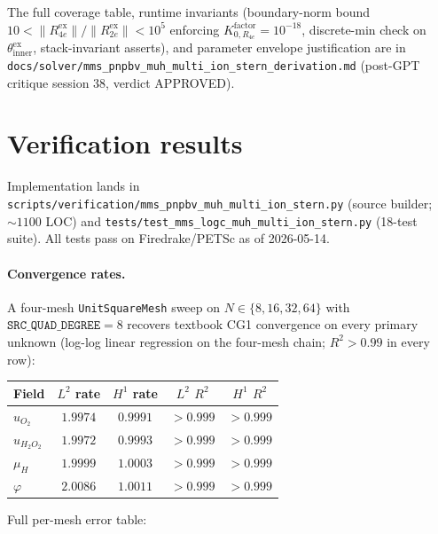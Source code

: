 \documentclass[11pt]{article}
\begin{document}
The full coverage table, runtime invariants (boundary-norm bound
$10 < \lVert R_{4e}^\mathrm{ex} \rVert / \lVert R_{2e}^\mathrm{ex} \rVert
< 10^5$ enforcing $K_{0,R_{4e}}^\mathrm{factor} = 10^{-18}$,
discrete-min check on $\theta_\mathrm{inner}^\mathrm{ex}$, stack-invariant
asserts), and parameter envelope justification are in
\verb|docs/solver/mms_pnpbv_muh_multi_ion_stern_derivation.md| (post-GPT
critique session 38, verdict APPROVED).

\section{Verification results}

Implementation lands in
\verb|scripts/verification/mms_pnpbv_muh_multi_ion_stern.py| (source
builder; $\sim 1100$ LOC) and
\verb|tests/test_mms_logc_muh_multi_ion_stern.py| (18-test suite). All
tests pass on Firedrake/PETSc as of 2026-05-14.

\paragraph{Convergence rates.} A four-mesh
\verb|UnitSquareMesh| sweep on $N \in \{8, 16, 32, 64\}$ with
$\mathtt{SRC\_QUAD\_DEGREE} = 8$ recovers textbook CG1 convergence on
every primary unknown (log-log linear regression on the four-mesh chain;
$R^2 > 0.99$ in every row):

\begin{center}
\begin{tabular}{lcc cc}
\toprule
Field & $L^2$ rate & $H^1$ rate & $L^2$ $R^2$ & $H^1$ $R^2$ \\
\midrule
$u_{O_2}$     & $1.9974$ & $0.9991$ & $>0.999$ & $>0.999$ \\
$u_{H_2O_2}$  & $1.9972$ & $0.9993$ & $>0.999$ & $>0.999$ \\
$\mu_H$       & $1.9999$ & $1.0003$ & $>0.999$ & $>0.999$ \\
$\varphi$     & $2.0086$ & $1.0011$ & $>0.999$ & $>0.999$ \\
\bottomrule
\end{tabular}
\end{center}

Full per-mesh error table:
\end{document}
